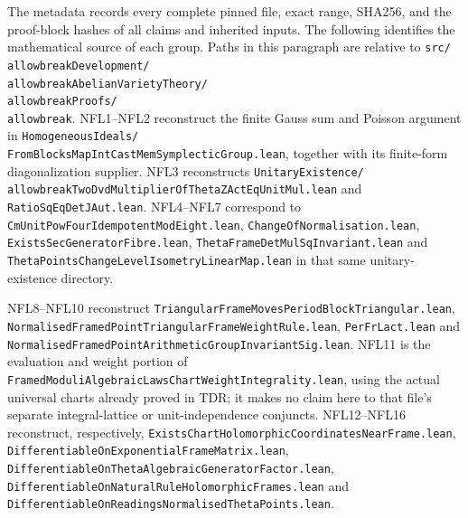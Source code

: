 \begingroup\raggedright
The metadata records every complete pinned file, exact range,
SHA256, and the proof-block hashes of all claims and inherited
inputs.  The following identifies the mathematical source of
each group.  Paths in this paragraph are relative to
\texttt{src/\\allowbreak{}Development/\\allowbreak{}Abelian\allowbreak{}Variety\allowbreak{}Theory/\\allowbreak{}Proofs/\\allowbreak{}}.
NFL1--NFL2 reconstruct the finite Gauss sum and Poisson argument
in \texttt{HomogeneousIdeals/}\\
\texttt{From\allowbreak{}Blocks\allowbreak{}Map\allowbreak{}Int\allowbreak{}Cast\allowbreak{}Mem\allowbreak{}Symplectic\allowbreak{}Group.lean}, together
with its finite-form diagonalization supplier.  NFL3 reconstructs
\texttt{Unitary\allowbreak{}Existence/\\allowbreak{}Two\allowbreak{}Dvd\allowbreak{}Multiplier\allowbreak{}Of\allowbreak{}Theta\allowbreak{}ZAct\allowbreak{}Eq\allowbreak{}Unit\allowbreak{}Mul.lean}
and \texttt{RatioSqEqDetJAut.lean}.
NFL4--NFL7 correspond to \texttt{Cm\allowbreak{}Unit\allowbreak{}Pow\allowbreak{}Four\allowbreak{}Idempotent\allowbreak{}Mod\allowbreak{}Eight.lean},
\texttt{ChangeOfNormalisation.lean},
\texttt{ExistsSecGeneratorFibre.lean},
\texttt{Theta\allowbreak{}Frame\allowbreak{}Det\allowbreak{}Mul\allowbreak{}Sq\allowbreak{}Invariant.lean} and
\texttt{Theta\allowbreak{}Points\allowbreak{}Change\allowbreak{}Level\allowbreak{}Isometry\allowbreak{}Linear\allowbreak{}Map.lean} in that
same unitary-existence directory.

NFL8--NFL10 reconstruct \texttt{Triangular\allowbreak{}Frame\allowbreak{}Moves\allowbreak{}Period\allowbreak{}Block\allowbreak{}Triangular.lean},
\texttt{Normalised\allowbreak{}Framed\allowbreak{}Point\allowbreak{}Triangular\allowbreak{}Frame\allowbreak{}Weight\allowbreak{}Rule.lean},
\texttt{PerFrLact.lean} and
\texttt{Normalised\allowbreak{}Framed\allowbreak{}Point\allowbreak{}Arithmetic\allowbreak{}Group\allowbreak{}Invariant\allowbreak{}Sig.lean}.
NFL11 is the evaluation and weight portion of
\texttt{Framed\allowbreak{}Moduli\allowbreak{}Algebraic\allowbreak{}Laws\allowbreak{}Chart\allowbreak{}Weight\allowbreak{}Integrality.lean},
using the actual universal charts already proved in TDR;
it makes no claim here to that file's separate integral-lattice
or unit-independence conjuncts.
NFL12--NFL16 reconstruct, respectively,
\texttt{Exists\allowbreak{}Chart\allowbreak{}Holomorphic\allowbreak{}Coordinates\allowbreak{}Near\allowbreak{}Frame.lean},
\texttt{Differentiable\allowbreak{}On\allowbreak{}Exponential\allowbreak{}Frame\allowbreak{}Matrix.lean},
\texttt{Differentiable\allowbreak{}On\allowbreak{}Theta\allowbreak{}Algebraic\allowbreak{}Generator\allowbreak{}Factor.lean},
\texttt{Differentiable\allowbreak{}On\allowbreak{}Natural\allowbreak{}Rule\allowbreak{}Holomorphic\allowbreak{}Frames.lean} and
\texttt{Differentiable\allowbreak{}On\allowbreak{}Readings\allowbreak{}Normalised\allowbreak{}Theta\allowbreak{}Points.lean}.

